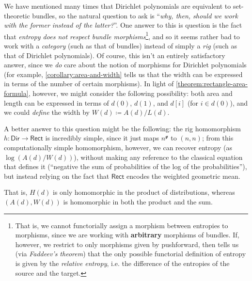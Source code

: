 \documentclass[11pt,fleqn]{article}
\newcommand{\yon}{\mathcal{y}}
\newcommand{\rig}[1]{\mathsf{#1}}
\newcommand{\Dir}{\rig{Dir}}
\newcommand{\Rect}{\rig{Rect}}
\begin{document}
\begin{remark}
\label{remark:why-dir-instead-of-bun}
  We have mentioned many times that Dirichlet polynomials are equivalent to set-theoretic bundles, so the natural question to ask is ``\emph{why, then, should we work with the former instead of the latter?}''.
  One answer to this is question is the fact that \emph{entropy does not respect bundle morphisms}\footnote{That is, we cannot functorially assign a morphism between entropies to morphisms, since we are working with \textbf{arbitrary} morphisms of bundles. If, however, we restrict to only morphisms given by pushforward, then \cite{BFL2011} tells us (via \emph{Faddeev's theorem}) that the only possible functorial definition of entropy is given by the \emph{relative entropy}, i.e. the difference of the entropies of the source and the target.}, and so it seems rather bad to work with a \emph{category} (such as that of bundles) instead of simply a \emph{rig} (such as that of Dirichlet polynomials).
  Of course, this isn't an entirely satisfactory answer, since we \emph{do} care about the notion of morphisms for Dirichlet polynomials (for example, \cref{corollary:area-and-width} tells us that the width can be expressed in terms of the number of certain morphisms).
  In light of \cref{theorem:rectangle-area-formula}, however, we might consider the following possibility:
  both area and length can be expressed in terms of $d(0)$, $d(1)$, and $d[i]$ (for $i\in d(0)$), and we could \emph{define} the width by $W(d)\coloneqq A(d)/L(d)$.

  A better answer to this question might be the following:
  the rig homomorphism $h\colon\Dir\to\Rect$ is incredibly simple, since it just maps $n^\yon$ to $(n,n)$;
  from this computationally simple homomorphism, however, we can recover entropy (as $\log(A(d)/W(d))$), without making any reference to the classical equation that defines it (``negative the sum of probabilities of the log of the probabilities''), but instead relying on the fact that $\Rect$ encodes the weighted geometric mean.

  That is, $H(d)$ is only homomorphic in the product of distributions, whereas $(A(d),W(d))$ is homomorphic in both the product and the sum.
\end{remark}
\end{document}
